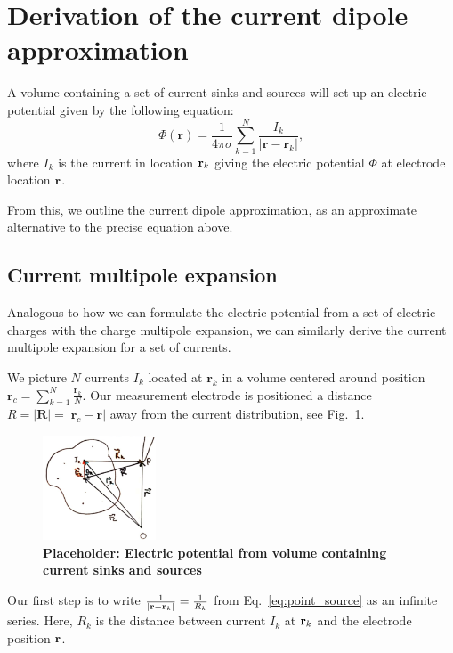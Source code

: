 \section{Derivation of the current dipole approximation}

A volume containing a set of current sinks and sources will set up an electric potential given by the following equation:
\begin{equation}\label{eq:point_source}
\Phi(\mathbf{r}) = \frac{1}{4 \pi \sigma} \sum_{k=1}^N \frac{I_k}{|\mathbf{r} - \mathbf{r}_k|},
\end{equation}
where $I_k$ is the current in location ${\bf r}_k$ giving the electric potential $\Phi$ at electrode location ${\bf r}$.

From this, we outline the current dipole approximation, as an approximate alternative to the precise equation above.

\subsection{Current multipole expansion}
Analogous to how we can formulate the electric potential from a set of electric charges with the charge multipole expansion, we can similarly derive the current multipole expansion for a set of currents.

We picture $N$ currents $I_k$ located at $\mathbf{r}_k$ in a volume centered around position $\mathbf{r}_c = \sum_{k = 1}^N \frac{\mathbf{r}_k}{N}$. Our measurement electrode is positioned a distance $R = |\mathbf{R}| = |\mathbf{r}_c - \mathbf{r}|$ away from the current distribution, see Fig.~\ref{fig:current_volume}.

\begin{figure}[!ht]
	\begin{center}
		\includegraphics[width=0.3\textwidth]{Figures/placeholder_appB1.png}
	\end{center}
	\caption{\textbf{Placeholder: Electric potential from volume containing current sinks and sources}}
	\label{fig:current_volume}
\end{figure}

Our first step is to write $\frac{1}{|{\bf r} - {\bf r}_k|} = \frac{1}{R_k}$ from Eq.~\ref{eq:point_source} as an infinite series. Here, $R_k$ is the distance between current $I_k$ at ${\bf r}_k$ and the electrode position ${\bf r}$.


